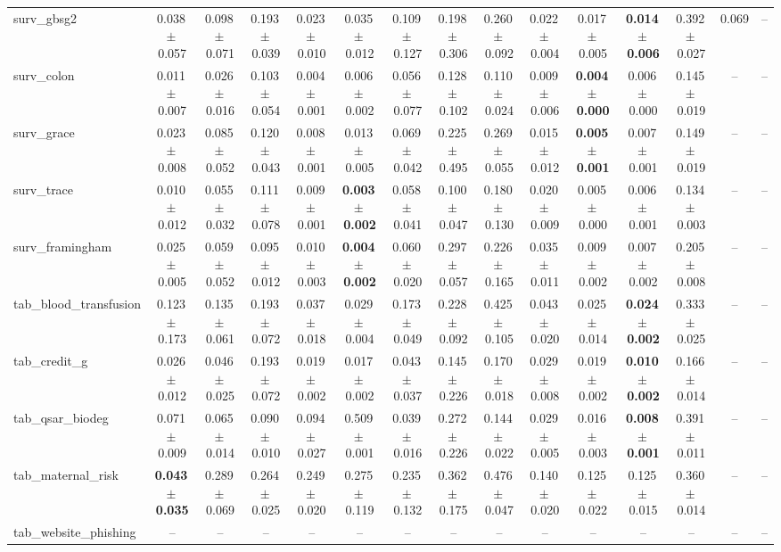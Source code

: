 \documentclass[8pt]{extarticle}
\begin{document}
\begin{longtable}{l*{14}{c}}
surv\_gbsg2 & 0.038\,$\pm$\,0.057 & 0.098\,$\pm$\,0.071 & 0.193\,$\pm$\,0.039 & 0.023\,$\pm$\,0.010 & 0.035\,$\pm$\,0.012 & 0.109\,$\pm$\,0.127 & 0.198\,$\pm$\,0.306 & 0.260\,$\pm$\,0.092 & 0.022\,$\pm$\,0.004 & 0.017\,$\pm$\,0.005 & \textbf{0.014\,$\pm$\,0.006} & 0.392\,$\pm$\,0.027 & 0.069 & -- \\
surv\_colon & 0.011\,$\pm$\,0.007 & 0.026\,$\pm$\,0.016 & 0.103\,$\pm$\,0.054 & 0.004\,$\pm$\,0.001 & 0.006\,$\pm$\,0.002 & 0.056\,$\pm$\,0.077 & 0.128\,$\pm$\,0.102 & 0.110\,$\pm$\,0.024 & 0.009\,$\pm$\,0.006 & \textbf{0.004\,$\pm$\,0.000} & 0.006\,$\pm$\,0.000 & 0.145\,$\pm$\,0.019 & -- & -- \\
surv\_grace & 0.023\,$\pm$\,0.008 & 0.085\,$\pm$\,0.052 & 0.120\,$\pm$\,0.043 & 0.008\,$\pm$\,0.001 & 0.013\,$\pm$\,0.005 & 0.069\,$\pm$\,0.042 & 0.225\,$\pm$\,0.495 & 0.269\,$\pm$\,0.055 & 0.015\,$\pm$\,0.012 & \textbf{0.005\,$\pm$\,0.001} & 0.007\,$\pm$\,0.001 & 0.149\,$\pm$\,0.019 & -- & -- \\
surv\_trace & 0.010\,$\pm$\,0.012 & 0.055\,$\pm$\,0.032 & 0.111\,$\pm$\,0.078 & 0.009\,$\pm$\,0.001 & \textbf{0.003\,$\pm$\,0.002} & 0.058\,$\pm$\,0.041 & 0.100\,$\pm$\,0.047 & 0.180\,$\pm$\,0.130 & 0.020\,$\pm$\,0.009 & 0.005\,$\pm$\,0.000 & 0.006\,$\pm$\,0.001 & 0.134\,$\pm$\,0.003 & -- & -- \\
surv\_framingham & 0.025\,$\pm$\,0.005 & 0.059\,$\pm$\,0.052 & 0.095\,$\pm$\,0.012 & 0.010\,$\pm$\,0.003 & \textbf{0.004\,$\pm$\,0.002} & 0.060\,$\pm$\,0.020 & 0.297\,$\pm$\,0.057 & 0.226\,$\pm$\,0.165 & 0.035\,$\pm$\,0.011 & 0.009\,$\pm$\,0.002 & 0.007\,$\pm$\,0.002 & 0.205\,$\pm$\,0.008 & -- & -- \\
tab\_blood\_transfusion & 0.123\,$\pm$\,0.173 & 0.135\,$\pm$\,0.061 & 0.193\,$\pm$\,0.072 & 0.037\,$\pm$\,0.018 & 0.029\,$\pm$\,0.004 & 0.173\,$\pm$\,0.049 & 0.228\,$\pm$\,0.092 & 0.425\,$\pm$\,0.105 & 0.043\,$\pm$\,0.020 & 0.025\,$\pm$\,0.014 & \textbf{0.024\,$\pm$\,0.002} & 0.333\,$\pm$\,0.025 & -- & -- \\
tab\_credit\_g & 0.026\,$\pm$\,0.012 & 0.046\,$\pm$\,0.025 & 0.193\,$\pm$\,0.072 & 0.019\,$\pm$\,0.002 & 0.017\,$\pm$\,0.002 & 0.043\,$\pm$\,0.037 & 0.145\,$\pm$\,0.226 & 0.170\,$\pm$\,0.018 & 0.029\,$\pm$\,0.008 & 0.019\,$\pm$\,0.002 & \textbf{0.010\,$\pm$\,0.002} & 0.166\,$\pm$\,0.014 & -- & -- \\
tab\_qsar\_biodeg & 0.071\,$\pm$\,0.009 & 0.065\,$\pm$\,0.014 & 0.090\,$\pm$\,0.010 & 0.094\,$\pm$\,0.027 & 0.509\,$\pm$\,0.001 & 0.039\,$\pm$\,0.016 & 0.272\,$\pm$\,0.226 & 0.144\,$\pm$\,0.022 & 0.029\,$\pm$\,0.005 & 0.016\,$\pm$\,0.003 & \textbf{0.008\,$\pm$\,0.001} & 0.391\,$\pm$\,0.011 & -- & -- \\
tab\_maternal\_risk & \textbf{0.043\,$\pm$\,0.035} & 0.289\,$\pm$\,0.069 & 0.264\,$\pm$\,0.025 & 0.249\,$\pm$\,0.020 & 0.275\,$\pm$\,0.119 & 0.235\,$\pm$\,0.132 & 0.362\,$\pm$\,0.175 & 0.476\,$\pm$\,0.047 & 0.140\,$\pm$\,0.020 & 0.125\,$\pm$\,0.022 & 0.125\,$\pm$\,0.015 & 0.360\,$\pm$\,0.014 & -- & -- \\
tab\_website\_phishing & -- & -- & -- & -- & -- & -- & -- & -- & -- & -- & -- & -- & -- & -- \\
\end{longtable}
\end{document}
